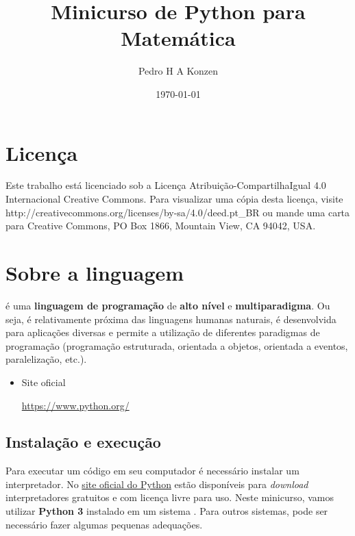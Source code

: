 \documentclass[12pt]{article}
\begin{document}
\title{Minicurso de Python para Matemática}
\author{Pedro H A Konzen}
\date{\today}

\maketitle

\nocite{Banin, NumPy, PythonTutorial, Ribeiro, TutorialsPoint, SciPy, Wazlawick}

\tableofcontents

\section{Licença}\label{sec_licenca}

Este trabalho está licenciado sob a Licença Atribuição-CompartilhaIgual 4.0 Internacional Creative Commons. Para visualizar uma cópia desta licença, visite http://creativecommons.org/licenses/by-sa/4.0/deed.pt\_BR ou mande uma carta para Creative Commons, PO Box 1866, Mountain View, CA 94042, USA.


\section{Sobre a linguagem}\label{sec_sobrepy}

{\python} é uma {\bf linguagem de programação} de {\bf alto nível} e {\bf multiparadigma}. Ou seja, é relativamente próxima das linguagens humanas naturais, é desenvolvida para aplicações diversas e permite a utilização de diferentes paradigmas de programação (programação estruturada, orientada a objetos, orientada a eventos, paralelização, etc.).

\begin{itemize}
\item Site oficial
  \begin{center}
    \href{https://www.python.org/}{https://www.python.org/}
  \end{center}
\end{itemize}

\subsection{Instalação e execução}

Para executar um código {\python} em seu computador é necessário instalar um interpretador. No \href{https://www.python.org/}{site oficial do Python} estão disponíveis para {\it download} interpretadores gratuitos e com licença livre para uso. Neste minicurso, vamos utilizar {\bf Python 3} instalado em um sistema {\linux}. Para outros sistemas, pode ser necessário fazer algumas pequenas adequações.
\end{document}
